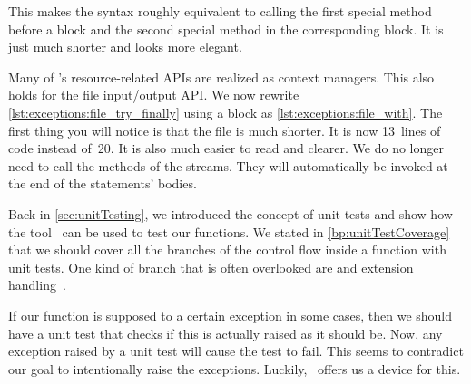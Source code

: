This makes the syntax roughly equivalent to calling the first special method before a  block and the second special method in the corresponding  block.
It is just much shorter and looks more elegant.

%

Many of \python's resource-related APIs are realized as context managers.
This also holds for the file input/output API.
We now rewrite \cref{lst:exceptions:file_try_finally} using a  block as \cref{lst:exceptions:file_with}.
The first thing you will notice is that the file is much shorter.
It is now 13~lines of code instead of~20.
It is also much easier to read and clearer.
We do no longer need to call the  methods of the streams.
They will automatically be invoked at the end of the  statements' bodies.%
%
\FloatBarrier%
\endhsection%
%
\endhsection%
%
%
%
\label{sec:testingExceptions}%
%
%
%
%
%

Back in \cref{sec:unitTesting}, we introduced the concept of unit tests and show how the tool \pytest\ can be used to test our functions.
We stated in \cref{bp:unitTestCoverage} that we should cover all the branches of the control flow inside a function with unit tests.
One kind of branch that is often overlooked are  and extension handling~\cite{LRBP2021AEHTPIOSL}.

If our function is supposed to  a certain exception in some cases, then we should have a unit test that checks if this  is actually raised as it should be.
Now, any exception raised by a unit test will cause the test to fail.
This seems to contradict our goal to intentionally raise the exceptions.
Luckily, \pytest\ offers us a device for this.


